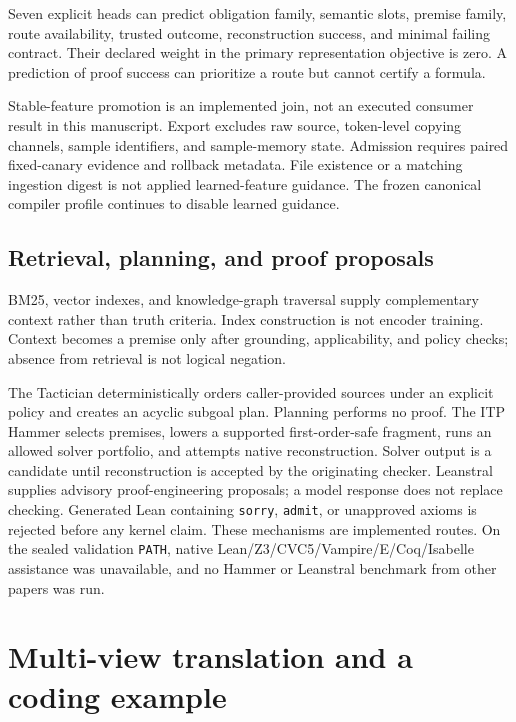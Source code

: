 \documentclass{article}
\begin{document}
Seven explicit heads can predict obligation family, semantic slots, premise family, route availability, trusted outcome, reconstruction success, and minimal failing contract. Their declared weight in the primary representation objective is zero. A prediction of proof success can prioritize a route but cannot certify a formula.

Stable-feature promotion is an implemented join, not an executed consumer result in this manuscript. Export excludes raw source, token-level copying channels, sample identifiers, and sample-memory state. Admission requires paired fixed-canary evidence and rollback metadata. File existence or a matching ingestion digest is not applied learned-feature guidance. The frozen canonical compiler profile continues to disable learned guidance.

\subsection{Retrieval, planning, and proof proposals}
BM25, vector indexes, and knowledge-graph traversal supply complementary context rather than truth criteria. Index construction is not encoder training. Context becomes a premise only after grounding, applicability, and policy checks; absence from retrieval is not logical negation.

The Tactician deterministically orders caller-provided sources under an explicit policy and creates an acyclic subgoal plan. Planning performs no proof. The ITP Hammer selects premises, lowers a supported first-order-safe fragment, runs an allowed solver portfolio, and attempts native reconstruction. Solver output is a candidate until reconstruction is accepted by the originating checker. Leanstral supplies advisory proof-engineering proposals; a model response does not replace checking. Generated Lean containing \texttt{sorry}, \texttt{admit}, or unapproved axioms is rejected before any kernel claim. These mechanisms are implemented routes. On the sealed validation \texttt{PATH}, native Lean/Z3/CVC5/Vampire/E/Coq/Isabelle assistance was unavailable, and no Hammer or Leanstral benchmark from other papers was run.

\section{Multi-view translation and a coding example}
\end{document}

